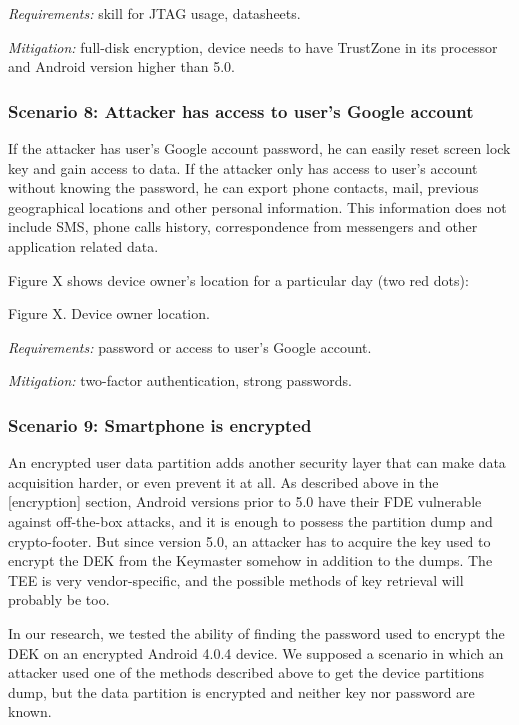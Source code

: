 \textsl{Requirements:} skill for JTAG usage, datasheets.

\textsl{Mitigation:} full-disk encryption, device needs to have TrustZone in its processor and Android version higher than 5.0.


\subsubsection{Scenario 8: Attacker has access to user’s Google account}

If the attacker has user’s Google account password, he can easily reset screen lock key and gain access to data. If the attacker only has access to user’s account without knowing the password, he can export phone contacts, mail, previous geographical locations and other personal information. This information does not include SMS, phone calls history,  correspondence from messengers and other application related data.

Figure X shows device owner’s location for a particular day (two red dots):

Figure X. Device owner location.

\textsl{Requirements:} password or access to user’s Google account.

\textsl{Mitigation:} two-factor authentication, strong passwords.


\subsubsection{Scenario 9: Smartphone is encrypted}

An encrypted user data partition adds another security layer that can make data acquisition harder, or even prevent it at all. As described above in the [encryption] section, Android versions prior to 5.0 have their FDE vulnerable against off-the-box attacks, and it is enough to possess the partition dump and crypto-footer. But since version 5.0, an attacker has to acquire the key used to encrypt the DEK from the Keymaster somehow in addition to the dumps. The TEE is very vendor-specific, and the possible methods of key retrieval will probably be too. 

In our research, we tested the ability of finding the password used to encrypt the DEK on an encrypted Android 4.0.4 device. We supposed a scenario in which an attacker used one of the methods described above to get the device partitions dump, but the data partition is encrypted and neither key nor password are known. 

